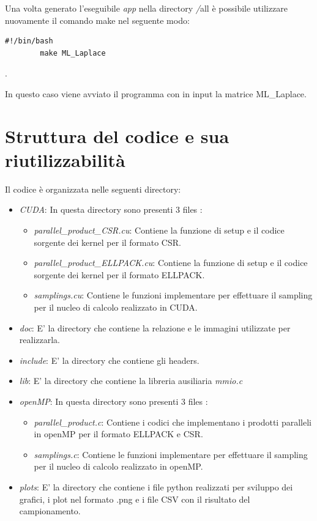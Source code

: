 \documentclass{article}
\begin{document}
Una volta generato l'eseguibile \textit{app} nella directory \textit/all è possibile utilizzare nuovamente il comando make nel seguente modo:
 \begin{lstlisting}[style=bashstyle]
        #!/bin/bash
        make ML_Laplace 
\end{lstlisting}. 
        
    In questo caso viene avviato il programma con in input la matrice ML\_Laplace.

\section{Struttura del codice e sua riutilizzabilità}
Il codice è organizzata nelle seguenti directory:
\begin{itemize}
    \item \textit{CUDA}: In questa directory sono presenti 3 files :
    \begin{itemize}
        \item \textit{parallel\_product\_CSR.cu}: Contiene la funzione di setup e il codice sorgente dei kernel per il formato CSR.
        \item \textit{parallel\_product\_ELLPACK.cu}:
        Contiene la funzione di setup e il codice sorgente dei kernel per il formato ELLPACK.
        \item \textit{samplings.cu}:
        Contiene le funzioni implementare per effettuare il sampling per il nucleo di calcolo realizzato in CUDA.
    \end{itemize}
    \item \textit{doc}: E' la directory che contiene la relazione e le immagini utilizzate per realizzarla.
    \item \textit{include}: E' la directory che contiene gli headers.
    \item \textit{lib}: E' la directory che contiene la libreria ausiliaria \textit{mmio.c} 
    \item \textit{openMP}:
     In questa directory sono presenti 3 files :
    \begin{itemize}
        \item \textit{parallel\_product.c}: Contiene i codici che implementano i prodotti paralleli in openMP per il formato ELLPACK e CSR.
        \item \textit{samplings.c}:
         Contiene le funzioni implementare per effettuare il sampling per il nucleo di calcolo realizzato in openMP.
    \end{itemize}
    \item \textit{plots}: E' la directory che contiene i file python realizzati per sviluppo dei grafici, i plot nel formato .png e i file CSV con il risultato del campionamento. 
\end{itemize}
\end{document}
